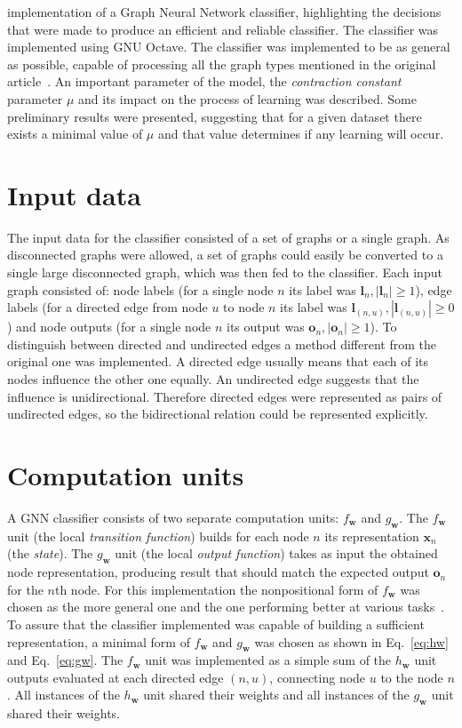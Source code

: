 \documentclass[]{spie}  %
\newcommand{\bm}[1]{\boldsymbol{#1}}
\begin{document}
implementation of a Graph Neural Network classifier, highlighting the decisions that were made to produce an efficient and reliable classifier. The classifier was implemented using GNU Octave. The classifier was implemented to be as general as possible, capable of processing all the graph types mentioned in the original article~\cite{scarselli2009graph}. An important parameter of the model, the \emph{contraction constant} parameter $\mu$ and its impact on the process of learning was described. Some preliminary results were presented, suggesting that for a given dataset there exists a minimal value of $\mu$ and that value determines if any learning will occur.

\section{Input data}
The input data for the classifier consisted of a set of graphs or a single graph. As disconnected graphs were allowed, a set of graphs could easily be converted to a single large disconnected graph, which was then fed to the classifier. Each input graph consisted of: node labels (for a single node $n$ its label was $\bm{l}_n, |\bm{l}_n| \geq 1$), edge labels (for a directed edge from node $u$ to node $n$ its label was $\bm{l}_{(n,u)}, |\bm{l}_{(n,u)}| \geq 0$) and node outputs (for a single node $n$ its output was $\bm{o}_n, |\bm{o}_n| \geq 1$). To distinguish between directed and undirected edges a method different from the original one was implemented. A directed edge usually means that each of its nodes influence the other one equally. An undirected edge suggests that the influence is unidirectional. Therefore directed edges were represented as pairs of undirected edges, so the bidirectional relation could be represented explicitly.

\section{Computation units}
A GNN classifier consists of two separate computation units: $f_{\bm{w}}$ and $g_{\bm{w}}$. The $f_{\bm{w}}$ unit (the local \emph{transition function}) builds for each node $n$ its representation $\bm{x}_n$ (the \emph{state}). The $g_{\bm{w}}$ unit (the local \emph{output function}) takes as input the obtained node representation, producing result that should match the expected output $\bm{o}_n$ for the $n$th node. For this implementation the nonpositional form of $f_{\bm{w}}$ was chosen as the more general one and the one performing better at various tasks~\cite{scarselli2009graph}. To assure that the classifier implemented was capable of building a sufficient representation, a minimal form of $f_{\bm{w}}$ and $g_{\bm{w}}$ was chosen as shown in Eq.~\ref{eq:hw} and Eq.~\ref{eq:gw}. The $f_{\bm{w}}$ unit was implemented as a simple sum of the $h_{\bm{w}}$ unit outputs evaluated at each directed edge $(n, u)$, connecting node $u$ to the node $n$. All instances of the $h_{\bm{w}}$ unit shared their weights and all instances of the $g_{\bm{w}}$ unit shared their weights. 
\end{document}
